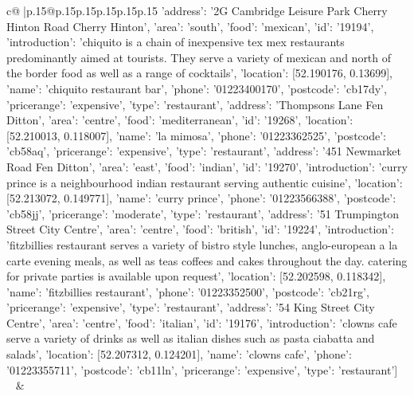 \documentclass{article}
\begin{document}
{\begin{supertabular}{c@{$\;$}|p{.15\linewidth}@{}p{.15\linewidth}p{.15\linewidth}p{.15\linewidth}p{.15\linewidth}p{.15\linewidth}}
{{{{'address': '2G Cambridge Leisure Park Cherry Hinton Road Cherry Hinton', 'area': 'south', 'food': 'mexican', 'id': '19194', 'introduction': 'chiquito is a chain of inexpensive tex mex restaurants predominantly aimed at tourists. They serve a variety of mexican and north of the border food as well as a range of cocktails', 'location': [52.190176, 0.13699], 'name': 'chiquito restaurant bar', 'phone': '01223400170', 'postcode': 'cb17dy', 'pricerange': 'expensive', 'type': 'restaurant'}, {'address': 'Thompsons Lane Fen Ditton', 'area': 'centre', 'food': 'mediterranean', 'id': '19268', 'location': [52.210013, 0.118007], 'name': 'la mimosa', 'phone': '01223362525', 'postcode': 'cb58aq', 'pricerange': 'expensive', 'type': 'restaurant'}, {'address': '451 Newmarket Road Fen Ditton', 'area': 'east', 'food': 'indian', 'id': '19270', 'introduction': 'curry prince is a neighbourhood indian restaurant serving authentic cuisine', 'location': [52.213072, 0.149771], 'name': 'curry prince', 'phone': '01223566388', 'postcode': 'cb58jj', 'pricerange': 'moderate', 'type': 'restaurant'}, {'address': '51 Trumpington Street City Centre', 'area': 'centre', 'food': 'british', 'id': '19224', 'introduction': 'fitzbillies restaurant serves a variety of bistro style lunches, anglo-european a la carte evening meals, as well as teas coffees and cakes throughout the day. catering for private parties is available upon request', 'location': [52.202598, 0.118342], 'name': 'fitzbillies restaurant', 'phone': '01223352500', 'postcode': 'cb21rg', 'pricerange': 'expensive', 'type': 'restaurant'}, {'address': '54 King Street City Centre', 'area': 'centre', 'food': 'italian', 'id': '19176', 'introduction': 'clowns cafe serve a variety of drinks as well as italian dishes such as pasta ciabatta and salads', 'location': [52.207312, 0.124201], 'name': 'clowns cafe', 'phone': '01223355711', 'postcode': 'cb11ln', 'pricerange': 'expensive', 'type': 'restaurant'}]\\ \tt  
	  } 
	   } 
	   } 
	 & \\ 
 

    \theutterance {}  


\end{supertabular}}
\end{document}
